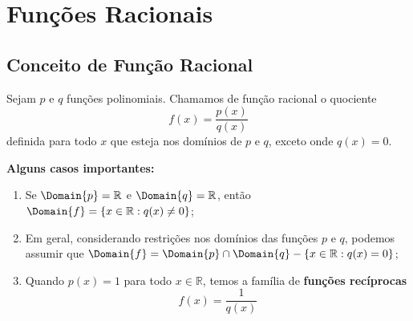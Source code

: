 \section{Funções Racionais}

\subsection{Conceito de Função Racional}

\begin{frame}
  \begin{definition}
    Sejam $p$ e $q$ funções polinomiais. Chamamos de função racional o quociente
    \begin{equation*}
      f(x) = \frac{p(x)}{q(x)}
    \end{equation*}
    definida para todo $x$ que esteja nos domínios de $p$ e $q$, exceto onde $q(x)=0$.
  \end{definition}
  \begin{highlight}
    \textbf{Alguns casos importantes:}
    \begin{enumerate}
      \item Se $\Domain{p}=\mathbb{R}$ e $\Domain{q}=\mathbb{R}$, então $\Domain{f} = \left\{x\in\mathbb{R}:q(x)\not=0\right\}$;
      \item Em geral, considerando restrições nos domínios das funções $p$ e $q$, podemos assumir que $\Domain{f}=\Domain{p}\cap\Domain{q}-\left\{x\in\mathbb{R}:q(x)=0\right\}$;
      \item Quando $p(x)=1$ para todo $x\in\mathbb{R}$, temos a família de \textbf{funções recíprocas}
      \begin{equation*}
        f(x) = \frac{1}{q(x)}
      \end{equation*}
    \end{enumerate}
  \end{highlight}
\end{frame}

